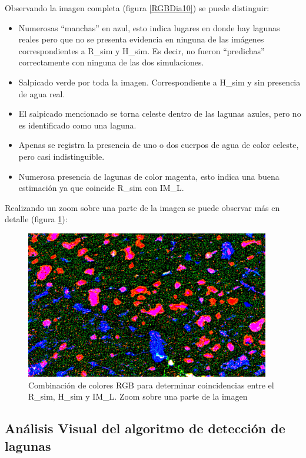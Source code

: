 \documentclass[10pt,a4paper, twoside]{report}
\begin{document}
Observando la imagen completa (figura \ref{RGBDia10}) se puede distinguir:

\begin{itemize}
	\item Numerosas "`manchas"' en azul, esto indica lugares en donde hay lagunas reales pero que no se presenta evidencia en ninguna de las imágenes correspondientes a R\_sim y H\_sim. Es decir, no fueron "`predichas"' correctamente con ninguna de las dos simulaciones.
	\item Salpicado verde por toda la imagen. Correspondiente a H\_sim y sin presencia de agua real. 
	\item El salpicado mencionado se torna celeste dentro de las lagunas azules, pero no es identificado como una laguna.
	\item Apenas se registra la presencia de uno o dos cuerpos de agua de color celeste, pero casi indistinguible.
	\item Numerosa presencia de lagunas de color magenta, esto indica una buena estimación ya que coincide R\_sim con IM\_L.
\end{itemize}

Realizando un zoom sobre una parte de la imagen se puede observar más en detalle (figura \ref{RGBDia10Zoom}):

\begin{figure}[H]
   \centering      
   \includegraphics[width=0.95\textwidth]{imagenes/RGBDia10Zoom.jpg}
 \caption{Combinación de colores RGB para determinar coincidencias entre el R\_sim, H\_sim y IM\_L. Zoom sobre una parte de la imagen}
 \label{RGBDia10Zoom}
\end{figure}

\subsection{Análisis Visual del algoritmo de detección de lagunas}
\end{document}

